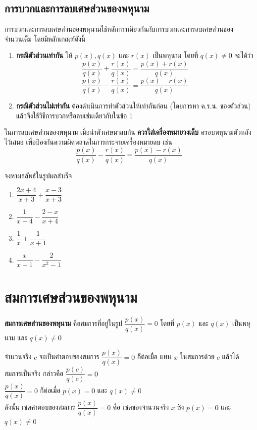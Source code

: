 \subsection{การบวกและการลบเศษส่วนของพหุนาม}
การบวกและการลบเศษส่วนของพหุนามใช้หลักการเดียวกันกับการบวกและการลบเศษส่วนของจำนวนเต็ม โดยมีหลักเกณฑ์ดังนี้
\begin{conceptbox}
	\begin{enumerate}[label=\arabic*., leftmargin=2.5em]
		\item \textbf{กรณีตัวส่วนเท่ากัน} 
		ให้ $p(x), q(x)$ และ $r(x)$ เป็นพหุนาม โดยที่ $q(x) \neq 0$ จะได้ว่า
		\[ \dfrac{p(x)}{q(x)} + \dfrac{r(x)}{q(x)} = \dfrac{p(x) + r(x)}{q(x)} \]
		\[ \dfrac{p(x)}{q(x)} - \dfrac{r(x)}{q(x)} = \dfrac{p(x) - r(x)}{q(x)} \]
		\item \textbf{กรณีตัวส่วนไม่เท่ากัน} 
		ต้องดำเนินการทำตัวส่วนให้เท่ากันก่อน (โดยการหา ค.ร.น. ของตัวส่วน) แล้วจึงใช้วิธีการบวกหรือลบเช่นเดียวกับในข้อ 1
	\end{enumerate}
\end{conceptbox}

\warning
ในการลบเศษส่วนของพหุนาม เมื่อนำตัวเศษมาลบกัน \textbf{ควรใส่เครื่องหมายวงเล็บ} ครอบพหุนามตัวหลังไว้เสมอ เพื่อป้องกันความผิดพลาดในการกระจายเครื่องหมายลบ เช่น
\[ \dfrac{p(x)}{q(x)} - \dfrac{r(x)}{q(x)} = \dfrac{p(x) - r(x)}{q(x)} \]

\newpage
\begin{examplebox}
	จงหาผลลัพธ์ในรูปผลสำเร็จ
	\begin{enumerate}[label=\arabic*), leftmargin=2.5em]
		\item $\dfrac{2x+4}{x+3} + \dfrac{x-3}{x+3}$
		\item $\dfrac{1}{x+4} - \dfrac{2-x}{x+4}$
		\item $\dfrac{1}{x} + \dfrac{1}{x+1}$
		\item $\dfrac{x}{x+1} - \dfrac{2}{x^2-1}$
	\end{enumerate}  
\end{examplebox}
\solution

\newpage
\section{สมการเศษส่วนของพหุนาม}

\textbf{สมการเศษส่วนของพหุนาม} คือสมการที่อยู่ในรูป $\dfrac{p(x)}{q(x)} = 0$ โดยที่ $p(x)$ และ $q(x)$ เป็นพหุนาม และ $q(x) \neq 0$ 

\begin{conceptbox}
	จำนวนจริง $c$ จะเป็นคำตอบของสมการ $\dfrac{p(x)}{q(x)} = 0$ ก็ต่อเมื่อ แทน $x$ ในสมการด้วย $c$ แล้วได้สมการเป็นจริง กล่าวคือ $\dfrac{p(c)}{q(c)} = 0$
	\\[0.5em]
	\observation $\dfrac{p(x)}{q(x)} = 0$ ก็ต่อเมื่อ $p(x) = 0$ และ $q(x) \neq 0$
	\\[0.5em]
	ดังนั้น เซตคำตอบของสมการ $\dfrac{p(x)}{q(x)} = 0$ คือ เซตของจำนวนจริง $x$ ซึ่ง $p(x) = 0$ และ $q(x) \neq 0$
\end{conceptbox}

